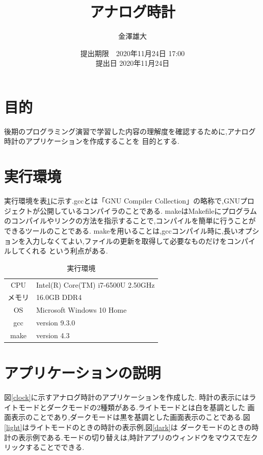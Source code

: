 \documentclass[a4j]{jarticle}
\title{アナログ時計}
\date{提出期限　2020年11月24日 17:00 \\ 提出日 2020年11月24日}
\author{金澤雄大}
\begin{document}
    \maketitle
    \thispagestyle{empty}
    \clearpage
    \addtocounter{page}{-1}
    \section{目的}
    後期のプログラミング演習で学習した内容の理解度を確認するために,アナログ時計のアプリケーションを作成することを
    目的とする.

    \section{実行環境}
    実行環境を表\ref{env}に示す.gccとは「GNU Compiler Collection」の略称で,GNUプロジェクトが公開しているコンパイラのことである.
    makeはMakefileにプログラムのコンパイルやリンクの方法を指示することで,コンパイルを簡単に行うことができるツールのことである.
    makeを用いることは,gccコンパイル時に,長いオプションを入力しなくてよい,ファイルの更新を取得して必要なものだけをコンパイルしてくれる
    という利点がある.

    \begin{table}[H]
      \caption{実行環境}
    \label{env}
    \begin{center}
        \begin{tabular}{c|l}\hline
          CPU & Intel(R) Core(TM) i7-6500U 2.50GHz  \\ 
          メモリ & 16.0GB DDR4 \\
          OS & Microsoft Windows 10 Home \\
          gcc &  version 9.3.0 \\
          make & version 4.3 \\ \hline
        \end{tabular}
    \end{center}
    \end{table}

    \section{アプリケーションの説明}
    \label{s3}
    図\ref{clock}に示すアナログ時計のアプリケーションを作成した.
    時計の表示にはライトモードとダークモードの2種類がある.ライトモードとは白を基調とした
    画面表示のことであり,ダークモードは黒を基調とした画面表示のことである.図\ref{light}はライトモードのときの時計の表示例,図\ref{dark}は
    ダークモードのときの時計の表示例である.モードの切り替えは,時計アプリのウィンドウをマウスで左クリックすることでできる.
\end{document}
